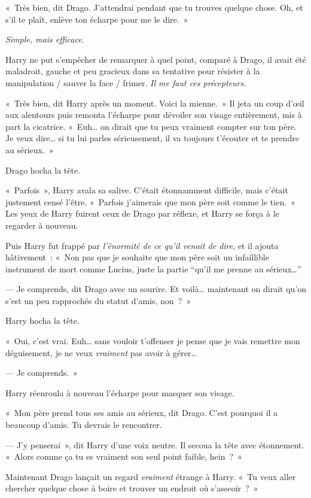 «~Très bien, dit Drago. J'attendrai pendant que tu trouves quelque chose. Oh, et s'il te plaît, enlève ton écharpe pour me le dire.~»

\emph{Simple, mais efficace}.

Harry ne put s'empêcher de remarquer à quel point, comparé à Drago, il avait été maladroit, gauche et peu gracieux dans sa tentative pour résister à la manipulation / sauver la face / frimer.
\emph{Il me faut ces précepteurs}.

«~Très bien, dit Harry après un moment. Voici la mienne.~»
Il jeta un coup d'œil aux alentours puis remonta l'écharpe pour dévoiler son visage entièrement, mis à part la cicatrice.
«~Euh… on dirait que tu peux vraiment compter sur ton père. Je veux dire… si tu lui parles sérieusement, il va toujours t'écouter et te prendre au sérieux.~»

Drago hocha la tête.

«~Parfois~», Harry avala sa salive. C'était étonnamment difficile, mais c'était justement censé l'être.
«~Parfois j'aimerais que mon père soit comme le tien.~»
Les yeux de Harry fuirent ceux de Drago par réflexe, et Harry se força à le regarder à nouveau.

Puis Harry fut frappé par \emph{l'énormité de ce qu'il venait de dire}, et il ajouta hâtivement~:
«~Non pas que je souhaite que mon père soit un infaillible instrument de mort comme Lucius, juste la partie “qu'il me prenne au sérieux…”

--- Je comprends, dit Drago avec un sourire. Et voilà… maintenant on dirait qu'on s'est un peu rapprochés du statut d'amis, non~?~»

Harry hocha la tête.

«~Oui, c'est vrai. Euh… sans vouloir t'offenser je pense que je vais remettre mon déguisement, je ne veux \emph{vraiment} pas avoir à gérer…

--- Je comprends.~»

Harry réenroula à nouveau l'écharpe pour masquer son visage.

«~Mon père prend tous ses amis au sérieux, dit Drago. C'est pourquoi il a beaucoup d'amis. Tu devrais le rencontrer.

--- J'y penserai~», dit Harry d'une voix neutre. Il secoua la tête avec étonnement. «~Alors comme ça tu es vraiment son seul point faible, hein~?~»

Maintenant Drago lançait un regard \emph{vraiment} étrange à Harry.
«~Tu veux aller chercher quelque chose à boire et trouver un endroit où s'asseoir~?~»

